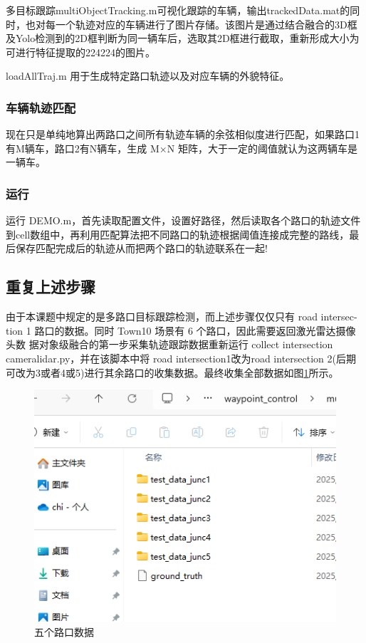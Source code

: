 多目标跟踪multiObjectTracking.m可视化跟踪的车辆，输出trackedData.mat的同时，也对每一个轨迹对应的车辆进行了图片存储。该图片是通过结合融合的3D框及Yolo检测到的2D框判断为同一辆车后，选取其2D框进行截取，重新形成大小为可进行特征提取的224\times224的图片。

loadAllTraj.m 用于生成特定路口轨迹以及对应车辆的外貌特征。

\subsubsection{车辆轨迹匹配}
现在只是单纯地算出两路口之间所有轨迹车辆的余弦相似度进行匹配，如果路口1有M辆车，路口2有N辆车，生成 M×N 矩阵，大于一定的阈值就认为这两辆车是一辆车。
\subsubsection{运行}
运行 DEMO.m，首先读取配置文件，设置好路径，然后读取各个路口的轨迹文件到cell数组中，再利用匹配算法把不同路口的轨迹根据阈值连接成完整的路线，最后保存匹配完成后的轨迹从而把两个路口的轨迹联系在一起!
\subsection{重复上述步骤}


由于本课题中规定的是多路口目标跟踪检测，而上述步骤仅仅只有 road intersec- tion 1 路口的数据。同时 Town10 场景有 6 个路口，因此需要返回激光雷达摄像头数 据对象级融合的第一步采集轨迹跟踪数据重新运行 collect intersection cameralidar.py，并在该脚本中将 road intersection1改为road intersection 2(后期可改为3或者4或5)进行其余路口的收集数据。最终收集全部数据如图\ref{fig:p18}所示。




\begin{figure}[htbp] %
	\centering
	\includegraphics[width=1\textwidth]{p18} %
	\caption{五个路口数据} %
	\label{fig:p18} %
\end{figure}






